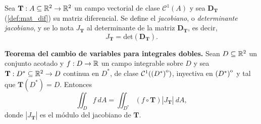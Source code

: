 


\begin{definition}
    Sea $\mathbf{T}:A\subseteq\mathbb{R}^2\to\mathbb{R}^2$ un campo vectorial de clase  $\mathcal{C}^1(A)$ y sea $\boldsymbol{D}_\mathbf{T}$ (\autoref{def:mat_dif}) su matriz diferencial.  Se define el \emph{jacobiano}, o \emph{determinante jacobiano}, y se lo nota $J_\mathbf{T}$ al determinante de la matriz $\boldsymbol{D}_\mathbf{T}$, es decir,  
    \[
        J_\mathbf{T}=\text{det}(\boldsymbol{D}_\mathbf{T}).
    \]
\end{definition}





\begin{theorem}
    \label{ teo:cambio_variables_r2}
    \textbf{Teorema del cambio de variables para integrales dobles.}   Sean $D \subseteq\mathbb{R}^2$ un conjunto acotado y  $f:D \to\mathbb{R}$ un campo integrable sobre $D$   y sea $\mathbf{T}:D^*\subseteq\mathbb{R}^2\to D$ continua en $D^*$,  de clase $\mathcal{C}^1({\kern0pt(D^*)}^{\mathrm{o}})$,  inyectiva en ${\kern0pt(D^*)}^{\mathrm{o}}$ y tal que $\mathbf{T}(D^*)=D$. Entonces
    \[
        \iint_D f\:dA=\iint_{D^*}(f\circ\mathbf{T})|J_\mathbf{T}|\:dA,
    \]
    donde $|J_\mathbf{T}|$ es el m\'odulo del jacobiano de $\mathbf{T}$.
\end{theorem}


